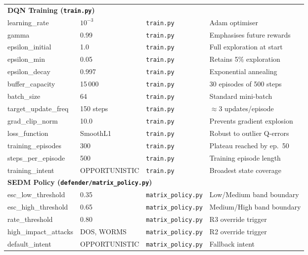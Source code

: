 \begin{longtable}{p{3.8cm}p{2.6cm}p{3.5cm}p{3.2cm}}
  \multicolumn{4}{l}{\textbf{DQN Training (\texttt{train.py})}} \\[3pt]
  learning\_rate     & $10^{-3}$   & \texttt{train.py}    & Adam optimiser \\
  gamma              & 0.99        & \texttt{train.py}    & Emphasises future rewards \\
  epsilon\_initial   & 1.0         & \texttt{train.py}    & Full exploration at start \\
  epsilon\_min       & 0.05        & \texttt{train.py}    & Retains 5\% exploration \\
  epsilon\_decay     & 0.997       & \texttt{train.py}    & Exponential annealing \\
  buffer\_capacity   & 15\,000     & \texttt{train.py}    & 30 episodes of 500 steps \\
  batch\_size        & 64          & \texttt{train.py}    & Standard mini-batch \\
  target\_update\_freq & 150 steps & \texttt{train.py}    & $\approx$3 updates/episode \\
  grad\_clip\_norm   & 10.0        & \texttt{train.py}    & Prevents gradient explosion \\
  loss\_function     & SmoothL1    & \texttt{train.py}    & Robust to outlier Q-errors \\
  training\_episodes & 300         & \texttt{train.py}    & Plateau reached by ep.\ 50 \\
  steps\_per\_episode & 500        & \texttt{train.py}    & Training episode length \\
  training\_intent   & OPPORTUNISTIC & \texttt{train.py}  & Broadest state coverage \\[6pt]

  \multicolumn{4}{l}{\textbf{SEDM Policy (\texttt{defender/matrix\_policy.py})}} \\[3pt]
  esc\_low\_threshold  & 0.35      & \texttt{matrix\_policy.py} & Low/Medium band boundary \\
  esc\_high\_threshold & 0.65      & \texttt{matrix\_policy.py} & Medium/High band boundary \\
  rate\_threshold      & 0.80      & \texttt{matrix\_policy.py} & R3 override trigger \\
  high\_impact\_attacks & DOS, WORMS & \texttt{matrix\_policy.py} & R2 override trigger \\
  default\_intent    & OPPORTUNISTIC & \texttt{matrix\_policy.py} & Fallback intent \\[6pt]


\end{longtable}
